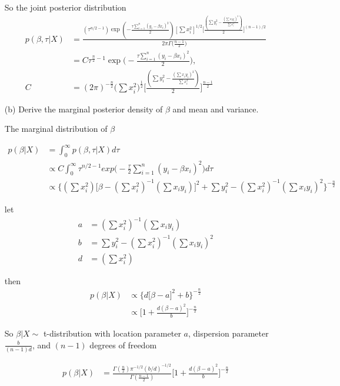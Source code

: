 \begin{itemize}
So the joint posterior distribution
\begin{align*}
	p(\beta, \tau|X) &= \frac{({\tau^{n/2-1}}) \exp(-\frac{\tau \sum_{i=1}^n (y_i-\beta x_i)^2}{2}) [\sum x_i^2]^{1/2} \Big [\frac{(\sum y_i^2 - \frac{(\sum x_iy_i)^2}{\sum x_i^2})}{2} \Big ]^{(n-1)/2}}{ 2\pi \Gamma \Big( \frac{n-1}{2} \Big)} \\
	& = C  {\tau^{\frac{n}{2}-1}} \exp \Big(-\frac{\tau \sum_{i=1}^n (y_i-\beta x_i)^2}{2} \Big), \\
	 C &= (2\pi)^{-\frac{n}{2}} \Big( \sum x_i^2\Big)^{\frac{1}{2}} \Big [\frac{(\sum y_i^2 - \frac{(\sum x_iy_i)^2}{\sum x_i^2})}{2} \Big ]^{\frac{n-1}{2}}
\end{align*}	

\item[(b)] Derive the marginal posterior density of $\beta$ and mean and variance.

The marginal distribution of $\beta$ 

\begin{align*}
	p(\beta|X) &= \int_{0}^{\infty} p(\beta, \tau|X) d \tau \\
	& \propto C \int_{0}^{\infty}  {\tau^{n/2-1}} exp \Big(-\frac{\tau}{2} \sum_{i=1}^n (y_i-\beta x_i)^2 \Big) d\tau \\
	& \propto \Biggl\{(\sum x_i^2) \Big[ \beta - (\sum x_i^2)^{-1} (\sum x_i y_i)\Big]^2 + \sum y_i^2 - (\sum x_i^2)^{-1} (\sum x_i y_i)^2 \Biggr\}^{-\frac{n}{2}}
\end{align*}	

let 
\begin{align*}
	a &= (\sum x_i^2)^{-1} (\sum x_i y_i) \\
	b&= \sum y_i^2 - (\sum x_i^2)^{-1} (\sum x_i y_i)^2 \\
	d &= (\sum x_i^2)
\end{align*}	

then 
\begin{align*}
	p(\beta|X) & \propto \Biggl\{d \Big[ \beta - a\Big]^2 + b \Biggr\}^{-\frac{n}{2}} \\
	& \propto \Big[ 1 + \frac{d(\beta - a)^2}{b}  \Big]^{-\frac{n}{2}}
\end{align*}	

So $\beta|X \sim$ t-distribution with location parameter $a$, dispersion parameter $\frac{b}{(n-1)d}$, and $(n-1)$ degrees of freedom

\begin{align*}
	p(\beta|X) & = \frac{\Gamma(\frac{n}{2}) \pi^{-1/2} (b/d)^{-1/2}}{\Gamma(\frac{n-1}{2})} \Big[ 1 + \frac{d(\beta - a)^2}{b}  \Big]^{-\frac{n}{2}}
\end{align*}	



\end{itemize}
